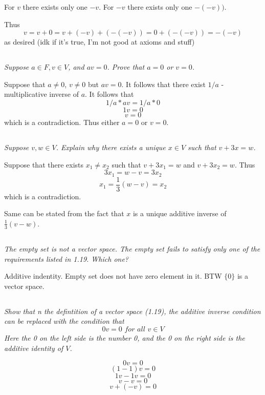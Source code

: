 \documentclass[11pt,oneside,titlepage]{book}
\begin{document}
For $v$ there exists only one $-v$. For $-v$ there exists only one $-(-v))$.

Thus
$$v = v + 0 = v + (-v) + (-(-v)) = 0 + (-(-v)) = -(-v)$$
as desired (idk if it's true, I'm not good at axioms and stuff)

\subsection{}
\textit{Suppose $a \in F, v \in V$, and $av = 0$. Prove that
  $a = 0$ or $v = 0$.}

Suppose that $a \neq 0$, $v \neq 0$ but $av = 0$. It follows that there
exist $1/a$ - multiplicative inverse of $a$. It follows that
$$1/a * av = 1/a * 0$$
$$1v = 0$$
$$v = 0$$
which is a contradiction. Thus either $a = 0$ or $v = 0$.

\subsection{}
\textit{Suppose $v, w \in V$. Explain why there exists a unique $x \in V$
  such that $v + 3x = w$.}

Suppose that there exists $x_1 \neq x_2$ such that
$v + 3x_1 = w$ and $v + 3x_2 = w$. Thus
$$3x_1 = w - v = 3x_2$$
$$x_1 = \frac{1}{3}(w - v) = x_2$$
which is a contradiction.

Same can be stated from the fact that $x$ is a unique additive inverse of
$\frac{1}{3}(v - w)$.

\subsection{}
\textit{The empty set is not a vector space. The empty set fails to satisfy
  only one of the requirements listed in 1.19. Which one?}

Additive indentity. Empty set does not have zero element in it.
BTW $\{0\}$ is a vector space.

\subsection{}
\textit{Show that n the defintition of a vector space (1.19), the additive
  inverse condition can be replaced with the condition that}
$$0v = 0 \textit{ for all } v \in V$$
\textit{Here the 0 on the left side is the number 0, and the 0 on the right
  side is the additive identity of $V$.}

$$0v = 0$$
$$(1 - 1)v = 0$$
$$1v - 1v = 0$$
$$v - v= 0$$
$$v + (- v)= 0$$
\end{document}
